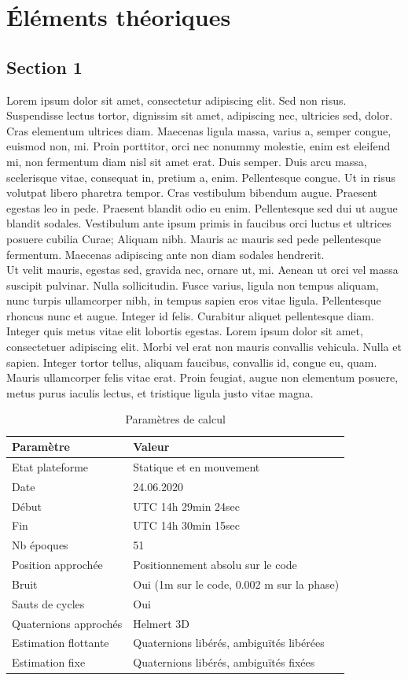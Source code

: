 \documentclass[twoside]{report}
\newcommand{\clearemptydoublepage}{\newpage{\pagestyle{empty}
\cleardoublepage}}
\begin{document}
\clearemptydoublepage
\chapter{Éléments théoriques}

\section{Section 1}
Lorem ipsum dolor sit amet, consectetur adipiscing elit. Sed non risus. Suspendisse lectus tortor, dignissim sit amet, adipiscing nec, ultricies sed, dolor. Cras elementum ultrices diam. Maecenas ligula massa, varius a, semper congue, euismod non, mi. Proin porttitor, orci nec nonummy molestie, enim est eleifend mi, non fermentum diam nisl sit amet erat. Duis semper. Duis arcu massa, scelerisque vitae, consequat in, pretium a, enim. Pellentesque congue. Ut in risus volutpat libero pharetra tempor. Cras vestibulum bibendum augue. Praesent egestas leo in pede. Praesent blandit odio eu enim. Pellentesque sed dui ut augue blandit sodales. Vestibulum ante ipsum primis in faucibus orci luctus et ultrices posuere cubilia Curae; Aliquam nibh. Mauris ac mauris sed pede pellentesque fermentum. Maecenas adipiscing ante non diam sodales hendrerit.\\
Ut velit mauris, egestas sed, gravida nec, ornare ut, mi. Aenean ut orci vel massa suscipit pulvinar. Nulla sollicitudin. Fusce varius, ligula non tempus aliquam, nunc turpis ullamcorper nibh, in tempus sapien eros vitae ligula. Pellentesque rhoncus nunc et augue. Integer id felis. Curabitur aliquet pellentesque diam. Integer quis metus vitae elit lobortis egestas. Lorem ipsum dolor sit amet, consectetuer adipiscing elit. Morbi vel erat non mauris convallis vehicula. Nulla et sapien. Integer tortor tellus, aliquam faucibus, convallis id, congue eu, quam. Mauris ullamcorper felis vitae erat. Proin feugiat, augue non elementum posuere, metus purus iaculis lectus, et tristique ligula justo vitae magna.

\begin{center}
    \begin{longtable}{ll}
        \caption{Paramètres de calcul}\label{tab:Paramètres calcul tangent bruit saut}\\
        \toprule
            Paramètre & Valeur \tabularnewline
        \midrule
        \endhead 
            Etat plateforme & Statique et en mouvement\tabularnewline
            Date & 24.06.2020 \tabularnewline
            Début & UTC 14h 29min 24sec \tabularnewline
            Fin & UTC 14h 30min 15sec \tabularnewline
            Nb époques & 51\tabularnewline
            Position approchée & Positionnement absolu sur le code \tabularnewline
            Bruit & Oui (1m sur le code, 0.002 m sur la phase)\tabularnewline
            Sauts de cycles & Oui \tabularnewline
            Quaternions approchés & Helmert 3D  \tabularnewline
            Estimation flottante & Quaternions libérés, ambiguïtés libérées \tabularnewline
            Estimation fixe & Quaternions libérés, ambiguïtés fixées \tabularnewline
        \bottomrule
    \end{longtable}
\end{center}
\end{document}
